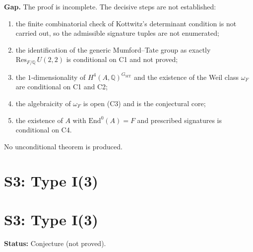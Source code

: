 \documentclass{article}
\begin{document}
\noindent\textbf{Gap.} The proof is incomplete. The decisive steps are not
established:
\begin{enumerate}
  \item[(i)] the finite combinatorial check of Kottwitz's determinant
    condition is not carried out, so the admissible signature tuples are not
    enumerated;
  \item[(ii)] the identification of the generic Mumford--Tate group as exactly
    $\mathrm{Res}_{F/\mathbb{Q}}\,U(2,2)$ is conditional on C1 and not proved;
  \item[(iii)] the $1$-dimensionality of $H^4(A,\mathbb{Q})^{G_{\mathrm{MT}}}$
    and the existence of the Weil class $\omega_F$ are conditional on C1 and
    C2;
  \item[(iv)] the algebraicity of $\omega_F$ is open (C3) and is the
    conjectural core;
  \item[(v)] the existence of $A$ with $\mathrm{End}^0(A)=F$ and prescribed
    signatures is conditional on C4.
\end{enumerate}
No unconditional theorem is produced.

\section{S3: Type I(3)}
\section*{S3: Type I(3)}

\noindent\textbf{Status:} Conjecture (not proved).

\medskip
\end{document}
